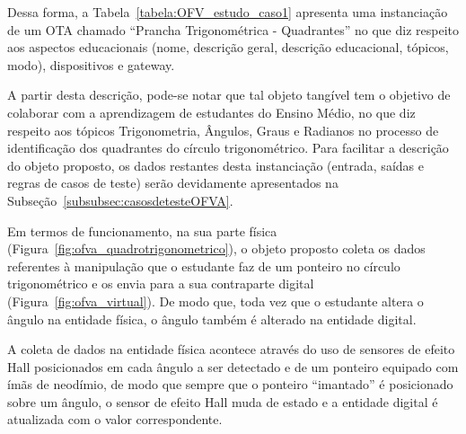 Dessa forma, a Tabela~\ref{tabela:OFV_estudo_caso1} apresenta uma instanciação de um OTA chamado ``Prancha  Trigonométrica - Quadrantes'' no que diz respeito aos aspectos educacionais (nome, descrição geral, descrição educacional, tópicos, modo), dispositivos e gateway. %

A partir desta descrição, pode-se notar que tal objeto tangível tem o objetivo de colaborar com a aprendizagem de estudantes do Ensino Médio, no que diz respeito aos tópicos Trigonometria, Ângulos, Graus e Radianos no processo de identificação dos quadrantes do círculo trigonométrico. %
Para facilitar a descrição do objeto proposto, os dados restantes desta instanciação (entrada, saídas e regras de casos de teste) serão devidamente apresentados na Subseção~\ref{subsubsec:casosdetesteOFVA}.



Em termos de funcionamento, na sua parte física (Figura~\ref{fig:ofva_quadrotrigonometrico}), o objeto proposto coleta os dados referentes à manipulação que o estudante faz de um ponteiro no círculo trigonométrico e os envia para a sua contraparte digital (Figura~\ref{fig:ofva_virtual}). De modo que, toda vez que o estudante altera o ângulo na entidade física, o ângulo também é alterado na entidade digital.

A coleta de dados na entidade física acontece através do uso de sensores de efeito Hall posicionados em cada ângulo a ser detectado e de um ponteiro equipado com ímãs de neodímio, de modo que sempre que o ponteiro ``imantado'' é posicionado sobre um ângulo, o sensor de efeito Hall muda de estado e a entidade digital é atualizada com o valor correspondente.

